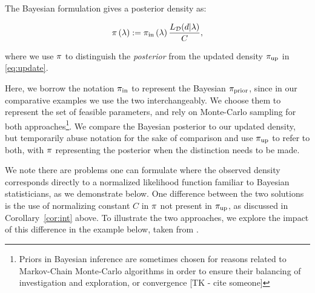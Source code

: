 
The Bayesian formulation gives a posterior density as:

\begin{equation}\label{eq:sb_post}
    \pi\left ( \lambda \right ) := \operatorname*{\pi_{in}}\left ( \lambda \right ) \frac{L_{\mathcal{D}} (d | \lambda)}{ C },
\end{equation}

where we use $\pi$ to distinguish the \emph{posterior} from the updated density $\operatorname*{\pi_{up}}$ in \eqref{eq:update}.

Here, we borrow the notation $\operatorname*{\pi_{in}}$ to represent the Bayesian $\pi_\text{prior}$, since in our comparative examples we use the two interchangeably.
We choose them to represent the set of feasible parameters, and rely on Monte-Carlo sampling for both approaches\footnote{Priors in Bayesian inference are sometimes chosen for reasons related to Markov-Chain Monte-Carlo algorithms in order to ensure their balancing of investigation and exploration, or convergence [TK - cite someone]}.
We compare the Bayesian posterior to our updated density, but temporarily abuse notation for the sake of comparison and use $\operatorname*{\pi_{up}}$ to refer to both, with $\pi$ representing the posterior when the distinction needs to be made.



We note there are problems one can formulate where the observed density corresponds directly to a normalized likelihood function familiar to Bayesian statisticians, as we demonstrate below.
One difference between the two solutions is the use of normalizing constant $C$ in $\pi$ not present in $\operatorname*{\pi_{up}}$, as discussed in Corollary~\ref{cor:int} above.
To illustrate the two approaches, we explore the impact of this difference in the example below, taken from \cite{BJW18}.


